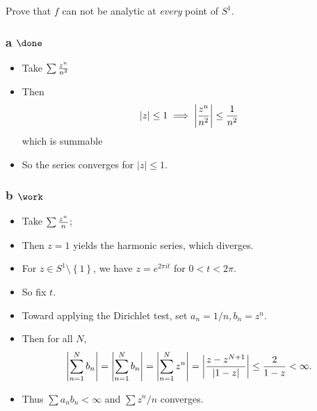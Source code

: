 Prove that \(f\) can not be analytic at \emph{every} point of \(S^1\).


\begin{solution}

\hfill

\begin{concept}

\hfill

\end{concept}

\hypertarget{a-done-1}{%
\subsubsection{\texorpdfstring{a
\(\done\)}{a \textbackslash done}}\label{a-done-1}}

\begin{itemize}
\tightlist
\item
  Take \(\sum {z^n \over n^2}\)
\item
  Then
  \begin{align*}{\left\lvert {z} \right\rvert}\leq 1 \implies {\left\lvert {z^n\over n^2} \right\rvert} \leq {1\over n^2}\end{align*}
  which is summable
\item
  So the series converges for \({\left\lvert {z} \right\rvert}\leq 1\).
\end{itemize}

\hypertarget{b-work-4}{%
\subsubsection{\texorpdfstring{b
\(\work\)}{b \textbackslash work}}\label{b-work-4}}

\begin{itemize}
\item
  Take \(\sum {z^n \over n}\);
\item
  Then \(z=1\) yields the harmonic series, which diverges.
\item
  For \(z\in S^1\setminus\left\{{1}\right\}\), we have
  \(z = e^{2\pi it}\) for \(0<t<2\pi\).
\item
  So fix \(t\).
\item
  Toward applying the Dirichlet test, set \(a_n = 1/n, b_n = z^n\).
\item
  Then for all \(N\),
  \begin{align*}
  {\left\lvert {\sum_{n=1}^N b_n} \right\rvert}
  = {\left\lvert {\sum_{n=1}^N b_n} \right\rvert}
  = {\left\lvert {\sum_{n=1}^N z^n} \right\rvert}
  = {\left\lvert {  {z-z^{N+1} \over {\left\lvert {1 - z} \right\rvert}} } \right\rvert} 
  \leq {2 \over 1-z} < \infty
  .\end{align*}
\item
  Thus \(\sum a_n b_n < \infty\) and \(\sum z^n/n\) converges.
\end{itemize}


\end{solution}
